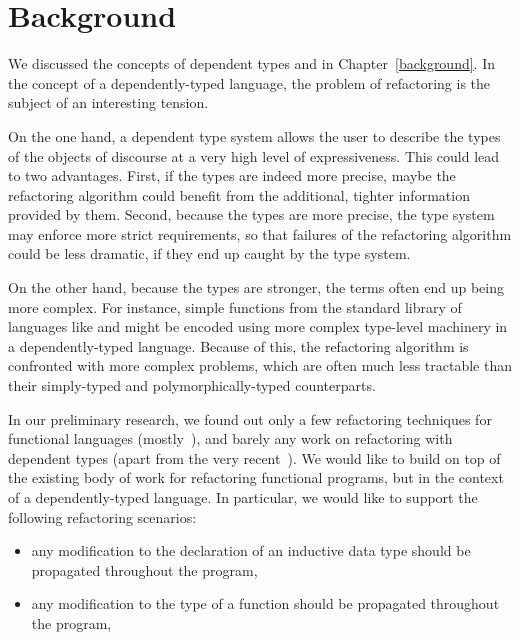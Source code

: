 \section{Background}\label{chick-background}

We discussed the concepts of dependent types and  in
Chapter~\ref{background}.  In the concept of a dependently-typed language, the
problem of refactoring is the subject of an interesting tension.

On the one hand, a dependent type system allows the user to describe the types
of the objects of discourse at a very high level of expressiveness.  This could
lead to two advantages.  First, if the types are indeed more precise, maybe the
refactoring algorithm could benefit from the additional, tighter information
provided by them.  Second, because the types are more precise, the type system
may enforce more strict requirements, so that failures of the refactoring
algorithm could be less dramatic, if they end up caught by the type system.

On the other hand, because the types are stronger, the terms often end up being
more complex.  For instance, simple functions from the standard library of
languages like \Haskell{} and \OCaml{} might be encoded using more complex
type-level machinery in a dependently-typed language.  Because of this, the
refactoring algorithm is confronted with more complex problems, which are often
much less tractable than their simply-typed and polymorphically-typed
counterparts.

In our preliminary research, we found out only a few refactoring techniques for
functional languages (mostly~), and barely any work on
refactoring with dependent types (apart from the very
recent~).  We would like to build on top of the
existing body of work for refactoring functional programs, but in the context of
a dependently-typed language.  In particular, we would like to support the
following refactoring scenarios:

\begin{itemize}

  \item any modification to the declaration of an inductive data type should be
propagated throughout the program,

  \item any modification to the type of a function should be propagated
throughout the program,

\end{itemize}

